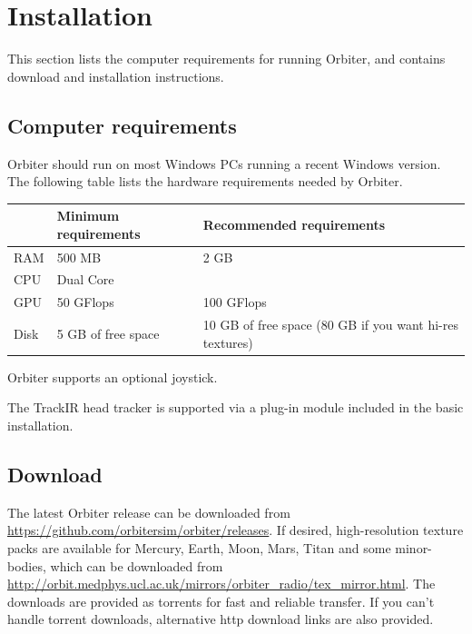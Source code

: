 \documentclass[Orbiter User Manual.tex]{subfiles}
\begin{document}
\section{Installation}
\label{sec:installation}

This section lists the computer requirements for running Orbiter, and contains
download and installation instructions.


\subsection{Computer requirements}

Orbiter should run on most Windows PCs running a recent Windows version.
The following table lists the hardware requirements needed by Orbiter.

	\begin{longtable}{ p{} p{} p{} }
	\hline
	& \textbf{Minimum requirements} & \textbf{Recommended requirements}\\
	\hline
	RAM & 500 MB & 2 GB\\
	\hline
	CPU & Dual Core &\\
	\hline
	GPU & 50 GFlops & 100 GFlops\\
	\hline
	Disk & 5 GB of free space & 10 GB of free space (80 GB if you want hi-res
		textures)\\
	\hline
	\end{longtable}

Orbiter supports an optional joystick.

The TrackIR head tracker is supported via a plug-in module included in the basic
installation.


\subsection{Download}

The latest Orbiter release can be downloaded from
\url{https://github.com/orbitersim/orbiter/releases}. If desired,
high-resolution texture packs are available for Mercury, Earth, Moon, Mars,
Titan and some minor-bodies, which can be downloaded from
\url{http://orbit.medphys.ucl.ac.uk/mirrors/orbiter_radio/tex_mirror.html}. The
downloads are provided as torrents for fast and reliable transfer. If you can't
handle torrent downloads, alternative http download links are also provided.
\end{document}
